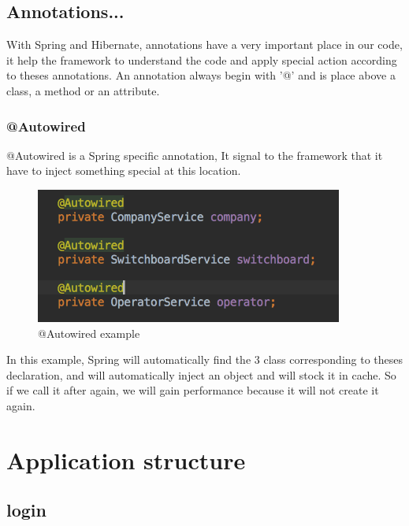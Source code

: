 \subsection{Annotations...}

With Spring and Hibernate, annotations have a very important place in our code, it help the framework to understand the code and apply special action according to theses annotations.
An annotation always begin with '@' and is place above a class, a method or an attribute.

\subsubsection{@Autowired}
@Autowired is a Spring specific annotation, It signal to the framework that it have to inject something special at this location.

\begin{figure}[!ht]
  \caption{@Autowired example}
  \centering
    \includegraphics[width=0.9\textwidth]{img/autowired.png}
\end{figure}

In this example, Spring will automatically find the 3 class corresponding to theses declaration, and will automatically inject an object and will stock it in cache. So if we call it after again, we will gain performance because it will not create it again.



\section{Application structure}

\subsection{login}

